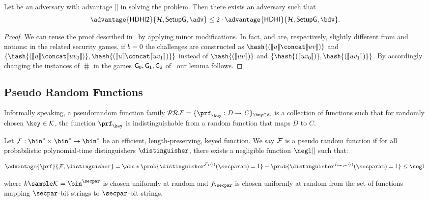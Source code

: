 \begin{lemma}\label{preliminaries:lemma:hdhi_hdhii}
    Let \adv{} be an adversary with advantage \advantage{\hdhii}{\hashSet, \groupSetup, \adv}[] in solving the \hdhii{} problem. Then there exists an adversary \bdv{} such that
    \[
        \advantage{\hdhii}{\hashSet, \groupSetup{}, \adv} \leq 2 \cdot \advantage{\hdhi}{\hashSet, \groupSetup{}, \bdv}.
    \]
\end{lemma}
\begin{proof}
    We can reuse the proof described in~\cite[Lemma 6.1]{abdalla2010robust} by applying minor modifications. In fact, \hdhi{} and \hdhii{} are, respectively, slightly different from \odh{} and \odhii{} notions: in the related security games, if $b=0$ the challenges are constructed as $\hash{(\groupenc{u} \concat \groupenc{uv})}$ and $\{\hash{(\groupenc{u} \concat \groupenc{uv_0})}, \hash{(\groupenc{u} \concat \groupenc{uv_1})}\}$ instead of $\hash{(\groupenc{uv})}$ and $\{\hash{(\groupenc{uv_0})}, \hash{(\groupenc{uv_1})}\}$. By accordingly changing the instances of $\hash{}$ in the games $\mathsf{G_0},\mathsf{G_1}, \mathsf{G_2}$ of~\cite[Lemma 6.1]{abdalla2010robust} our lemma follows.
\end{proof}

\subsection{Pseudo Random Functions}\label{preliminaries:definitions:prfs}

Informally speaking, a pseudorandom function family $\prfSet = \indexedset{\prf_{\key}: \mathit{D} \to \mathit{C}}{\key \in \keyspace}$ is a collection of functions such that for randomly chosen $\key \in \keyspace$, the function $\prf_{\key}$ is indistinguishable from a random function that maps $\mathit{D}$ to $\mathit{C}$.

\begin{definition}
Let $\funcSet: \bin^* \times \bin^* \to \bin^*$ be an efficient, length-preserving, keyed function. We say $\mathcal{F}$ is a pseudo random function if for all probabilistic polynomial-time distinguishers $\distinguisher$, there exists a negligible function $\negl[]$ such that:

\[
	\advantage{\prf}{\funcSet, \distinguisher} = \abs*{\prob{ \distinguisher^{\funcSet_k(\cdot)}(\secparam)=1 } - \prob{ \distinguisher^{f_\secpar(\cdot)}(\secparam)=1 }} \leq \negl
\]

where $k \sample \keyspace = \bin^\secpar$ is chosen uniformly at random and $f_\secpar$ is chosen uniformly at random from the set of functions mapping $\secpar$-bit strings to $\secpar$-bit strings.
\end{definition}

